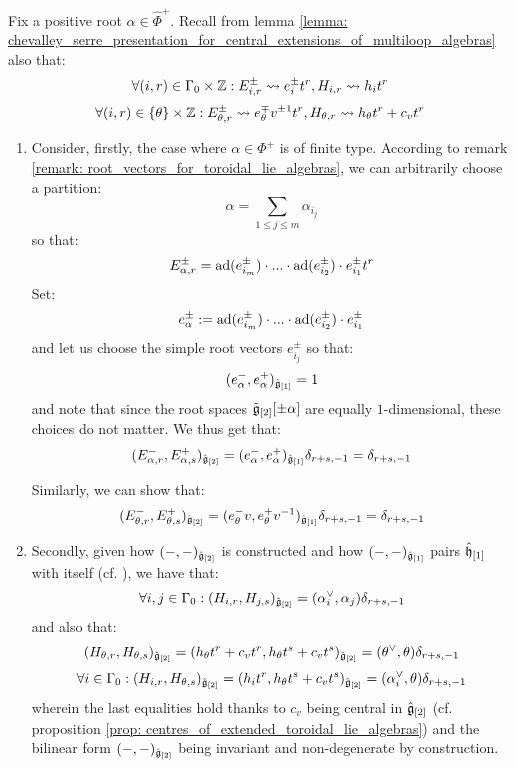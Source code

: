         \begin{remark} \label{remark: pairing_positive_and_negative_root_spaces_in_toroidal_lie_algebras}
            Fix a positive root $\alpha \in \hat{\Phi}^+$. Recall from lemma \ref{lemma: chevalley_serre_presentation_for_central_extensions_of_multiloop_algebras} also that:
                $$\forall (i, r) \in \Gamma_0 \x \Z: E_{i, r}^{\pm} \mapsto e_i^{\pm} t^r, H_{i, r} \mapsto h_i t^r$$
                $$\forall (i, r) \in \{\theta\} \x \Z: E_{\theta, r}^{\pm} \mapsto e_{\theta}^{\mp} v^{\pm 1} t^r, H_{\theta, r} \mapsto h_{\theta} t^r + c_v t^r$$
            \begin{enumerate}
                \item Consider, firstly, the case where $\alpha \in \Phi^+$ is of finite type. According to remark \ref{remark: root_vectors_for_toroidal_lie_algebras}, we can arbitrarily choose a partition:
                    $$\alpha = \sum_{1 \leq j \leq m} \alpha_{i_j}$$
                so that:
                    $$E_{\alpha, r}^{\pm} = \mathrm{ad}(e_{i_m}^{\pm}) \cdot ... \cdot \mathrm{ad}(e_{i_2}^{\pm}) \cdot e_{i_1}^{\pm} t^r$$
                Set:
                    $$e_{\alpha}^{\pm} := \mathrm{ad}(e_{i_m}^{\pm}) \cdot ... \cdot \mathrm{ad}(e_{i_2}^{\pm}) \cdot e_{i_1}^{\pm}$$
                and let us choose the simple root vectors $e_{i_j}^{\pm}$ so that:
                    $$(e_{\alpha}^-, e_{\alpha}^+)_{\hat{\mathfrak{g}}_{[1]}} = 1$$
                and note that since the root spaces $\tilde{\mathfrak{g}}_{[2]}[\pm\alpha]$ are equally $1$-dimensional, these choices do not matter. We thus get that:
                    $$(E_{\alpha, r}^-, E_{\alpha, s}^+)_{\hat{\mathfrak{g}}_{[2]}} = (e_{\alpha}^-, e_{\alpha}^+)_{\hat{\mathfrak{g}}_{[1]}} \delta_{r + s, -1} = \delta_{r + s, -1}$$

                Similarly, we can show that:
                    $$(E_{\theta, r}^-, E_{\theta, s}^+)_{\hat{\mathfrak{g}}_{[2]}} = (e_{\theta}^- v, e_{\theta}^+ v^{-1})_{\hat{\mathfrak{g}}_{[1]}} \delta_{r + s, -1} = \delta_{r + s, -1}$$
                \item Secondly, given how $(-, -)_{\hat{\mathfrak{g}}_{[2]}}$ is constructed and how $(-, -)_{\hat{\mathfrak{g}}_{[1]}}$ pairs $\hat{\mathfrak{h}}_{[1]}$ with itself (cf. \cite[Chapter 2]{kac_infinite_dimensional_lie_algebras}), we have that:
                    $$\forall i,j \in \Gamma_0: (H_{i, r}, H_{j, s})_{\hat{\mathfrak{g}}_{[2]}} = (\alpha_i^{\vee}, \alpha_j) \delta_{r + s, -1}$$
                and also that:
                    $$(H_{\theta, r}, H_{\theta, s})_{\hat{\mathfrak{g}}_{[2]}} = (h_{\theta} t^r + c_v t^r, h_{\theta} t^s + c_v t^s)_{\hat{\mathfrak{g}}_{[2]}} = (\theta^{\vee}, \theta) \delta_{r + s, -1}$$
                    $$\forall i \in \Gamma_0: (H_{i, r}, H_{\theta, s})_{\hat{\mathfrak{g}}_{[2]}} = (h_i t^r, h_{\theta} t^s + c_v t^s)_{\hat{\mathfrak{g}}_{[2]}} = (\alpha_i^{\vee}, \theta) \delta_{r + s, -1}$$
                wherein the last equalities hold thanks to $c_v$ being central in $\hat{\mathfrak{g}}_{[2]}$ (cf. proposition \ref{prop: centres_of_extended_toroidal_lie_algebras}) and the bilinear form $(-, -)_{\hat{\mathfrak{g}}_{[2]}}$ being invariant and non-degenerate by construction. 


\end{enumerate}
\end{remark}
